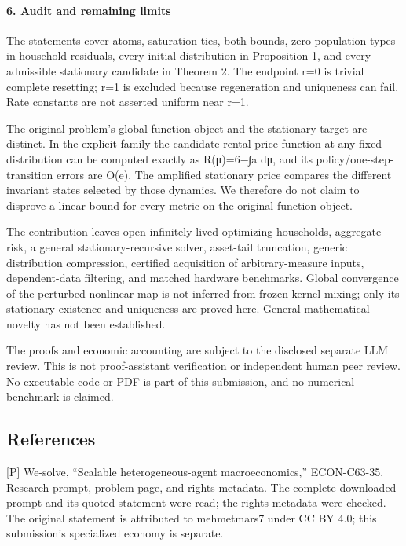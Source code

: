 \documentclass{article}
\begin{document}
\paragraph{6. Audit and remaining limits}

The statements cover atoms, saturation ties, both bounds, zero-population types in household residuals, every initial distribution in Proposition 1, and every admissible stationary candidate in Theorem 2. The endpoint r=0 is trivial complete resetting; r=1 is excluded because regeneration and uniqueness can fail. Rate constants are not asserted uniform near r=1.

The original problem's global function object and the stationary target are distinct. In the explicit family the candidate rental-price function at any fixed distribution can be computed exactly as R(μ)=6−∫a dμ, and its policy/one-step-transition errors are O(e). The amplified stationary price compares the different invariant states selected by those dynamics. We therefore do not claim to disprove a linear bound for every metric on the original function object.

The contribution leaves open infinitely lived optimizing households, aggregate risk, a general stationary-recursive solver, asset-tail truncation, generic distribution compression, certified acquisition of arbitrary-measure inputs, dependent-data filtering, and matched hardware benchmarks. Global convergence of the perturbed nonlinear map is not inferred from frozen-kernel mixing; only its stationary existence and uniqueness are proved here. General mathematical novelty has not been established.

The proofs and economic accounting are subject to the disclosed separate LLM review. This is not proof-assistant verification or independent human peer review. No executable code or PDF is part of this submission, and no numerical benchmark is claimed.

\subsection{References}

[P] We-solve, ``Scalable heterogeneous-agent macroeconomics,'' ECON-C63-35. \href{https://we-solve.github.io/prompts/ECON-C63-35.txt}{Research prompt}, \href{https://we-solve.github.io/problems/scalable-heterogeneous-agent-macroeconomics/}{problem page}, and \href{https://github.com/We-Solve/we-solve.github.io/blob/main/problems/scalable-heterogeneous-agent-macroeconomics/problem.yaml}{rights metadata}. The complete downloaded prompt and its quoted statement were read; the rights metadata were checked. The original statement is attributed to mehmetmars7 under CC BY 4.0; this submission's specialized economy is separate.
\end{document}
